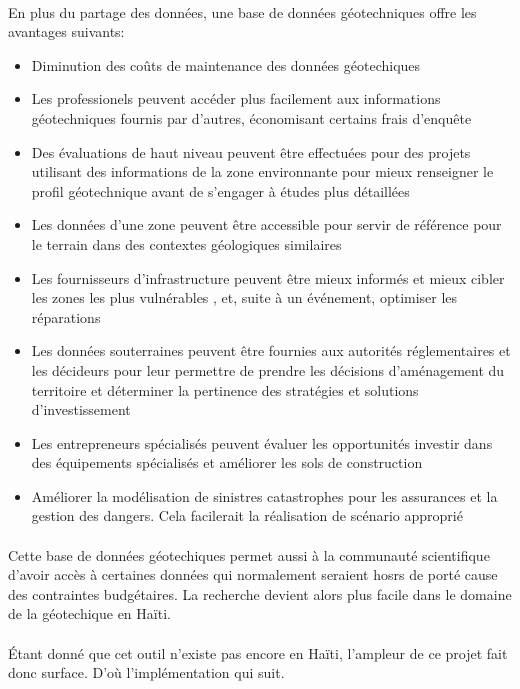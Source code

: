 \paragraph{}
En plus du partage des données, une base de données géotechniques
offre les avantages suivants:
\begin{itemize}
    \item Diminution des coûts de maintenance des données géotechiques
    \item Les professionels peuvent accéder plus facilement aux informations géotechniques
    fournis par d'autres, économisant certains frais d'enquête
    \item Des évaluations de haut niveau peuvent être effectuées pour des
    projets utilisant des informations de la zone environnante pour
    mieux renseigner le profil géotechnique avant de s'engager à
    études plus détaillées
    \item Les données d'une zone peuvent être
    accessible pour servir de référence pour le terrain  dans des contextes géologiques similaires
    \item Les fournisseurs d'infrastructure peuvent être mieux informés
    et mieux cibler les zones les plus vulnérables , et, suite à un événement, optimiser les réparations
    \item  Les données souterraines peuvent être fournies aux autorités réglementaires
    et les décideurs pour leur permettre de prendre
    les décisions d'aménagement du territoire et déterminer la pertinence
    des stratégies et solutions d'investissement
    \item  Les entrepreneurs spécialisés peuvent évaluer les opportunités
    investir dans des équipements spécialisés et améliorer les sols de construction
    \item Améliorer la modélisation de sinistres catastrophes pour les assurances et
    la gestion des dangers. Cela facilerait la réalisation de scénario approprié
\end{itemize}

\paragraph{}
Cette base de données géotechiques permet aussi à la communauté
scientifique d'avoir accès à certaines données qui normalement seraient 
hosrs de porté cause des contraintes budgétaires. La recherche devient alors plus 
facile dans le domaine de la géotechique en Haïti.


\paragraph{}
Étant donné que cet outil n'existe pas encore
en Haïti, l'ampleur de ce projet fait donc surface.
D'où l'implémentation qui suit.


